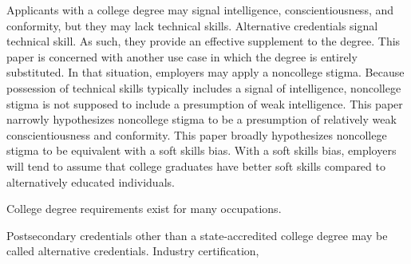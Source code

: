 \documentclass[review]{elsarticle}
\begin{document}
Applicants with a college degree may signal intelligence, conscientiousness, and conformity,
but they may lack technical skills.
Alternative credentials signal technical skill.
As such, they provide an effective supplement to the degree.
This paper is concerned with another use case in which the degree is entirely substituted.
In that situation, employers may apply a noncollege stigma.
Because possession of technical skills typically includes a signal of intelligence,
noncollege stigma is not supposed to include a presumption of weak intelligence.
This paper narrowly hypothesizes noncollege stigma to be a presumption of relatively weak conscientiousness and conformity.
This paper broadly hypothesizes noncollege stigma to be equivalent with a soft skills bias.
With a soft skills bias, employers will tend to assume that college graduates have better soft skills compared to alternatively educated individuals.







College degree requirements exist for many occupations.

Postsecondary credentials other than a state-accredited college degree may be called alternative credentials.
Industry certification,



\end{document}
